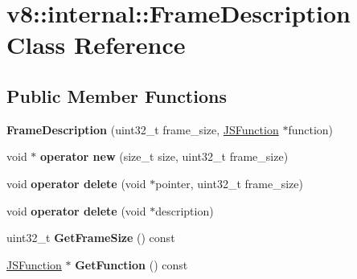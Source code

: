 \hypertarget{classv8_1_1internal_1_1_frame_description}{}\section{v8\+:\+:internal\+:\+:Frame\+Description Class Reference}
\label{classv8_1_1internal_1_1_frame_description}
\subsection*{Public Member Functions}
\begin{DoxyCompactItemize}
\item 
\hypertarget{classv8_1_1internal_1_1_frame_description_ab045b4005ef63ed2e2e38f2aba4b2f4a}{}{\bfseries Frame\+Description} (uint32\+\_\+t frame\+\_\+size, \hyperlink{classv8_1_1internal_1_1_j_s_function}{J\+S\+Function} $\ast$function)\label{classv8_1_1internal_1_1_frame_description_ab045b4005ef63ed2e2e38f2aba4b2f4a}

\item 
\hypertarget{classv8_1_1internal_1_1_frame_description_adb31357a74efb87f90ea81886d4baa74}{}void $\ast$ {\bfseries operator new} (size\+\_\+t size, uint32\+\_\+t frame\+\_\+size)\label{classv8_1_1internal_1_1_frame_description_adb31357a74efb87f90ea81886d4baa74}

\item 
\hypertarget{classv8_1_1internal_1_1_frame_description_aee5885f86760273016b3e67405389c58}{}void {\bfseries operator delete} (void $\ast$pointer, uint32\+\_\+t frame\+\_\+size)\label{classv8_1_1internal_1_1_frame_description_aee5885f86760273016b3e67405389c58}

\item 
\hypertarget{classv8_1_1internal_1_1_frame_description_ab39a58e397a051f4b77eb31964790891}{}void {\bfseries operator delete} (void $\ast$description)\label{classv8_1_1internal_1_1_frame_description_ab39a58e397a051f4b77eb31964790891}

\item 
\hypertarget{classv8_1_1internal_1_1_frame_description_a72013fd7ea12656feaee3bddd2b5f57a}{}uint32\+\_\+t {\bfseries Get\+Frame\+Size} () const \label{classv8_1_1internal_1_1_frame_description_a72013fd7ea12656feaee3bddd2b5f57a}

\item 
\hypertarget{classv8_1_1internal_1_1_frame_description_a67112bd1da927e0ba7780bab778ddffd}{}\hyperlink{classv8_1_1internal_1_1_j_s_function}{J\+S\+Function} $\ast$ {\bfseries Get\+Function} () const \label{classv8_1_1internal_1_1_frame_description_a67112bd1da927e0ba7780bab778ddffd}


\end{DoxyCompactItemize}
